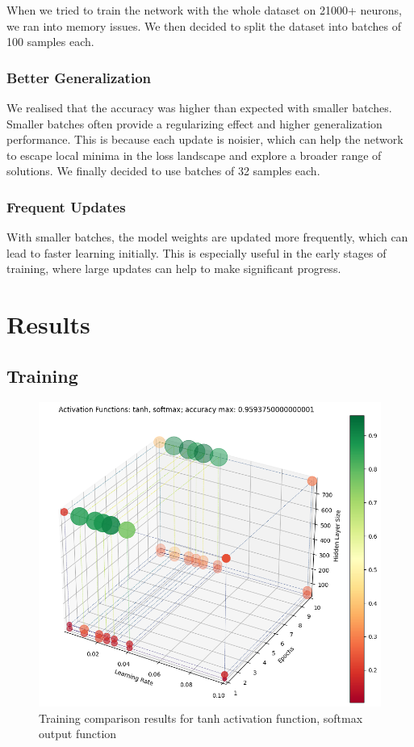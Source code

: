 \documentclass{article}
\begin{document}
When we tried to train the network with the 
whole dataset on 21000+ neurons, 
we ran into memory issues.
We then decided to split the dataset into batches of 100 samples each.

\subsubsection{Better Generalization} 
We realised that the accuracy was higher than expected with smaller batches.
Smaller batches often provide a regularizing effect
 and higher generalization performance. 
 This is because each update is noisier, 
 which can help the network to escape 
 local minima in the loss landscape and 
 explore a broader range of solutions.
We finally decided to use batches of 32 samples each.

\subsubsection{Frequent Updates} 
With smaller batches, 
the model weights are updated more frequently, 
which can lead to faster learning initially. 
This is especially useful in the early stages of training, 
where large updates can help to make significant progress.


\section{Results}
\subsection{Training}
\begin{figure}
    \centering
    \includegraphics[width=\textwidth]{media/training/results_plot_activation_functions_tanh_softmax_2023-12-29162932.png}
    \caption{Training comparison results for tanh activation function, softmax output function}
    \label{fig:comparison}
\end{figure}
\end{document}
